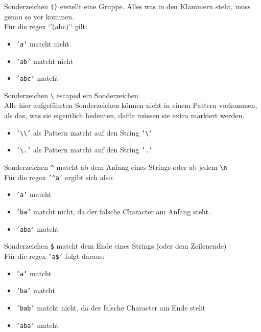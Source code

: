 \begin{frame}{Sonderzeichen}
	\texttt{()} erstellt eine Gruppe. Alles was in den Klammern steht, muss genau so vor kommen.\\[.25cm]
	Für die regex `'(abc)'` gilt:\\
	\begin{itemize}
		\item \texttt{'a'} matcht nicht
		\item \texttt{'ab'} matcht nicht
		\item \texttt{'abc'} matcht
	\end{itemize}
\end{frame}

\begin{frame}{Sonderzeichen}
	\texttt{\textbackslash} escaped ein Sonderzeichen.\\[.25cm]
	Alle hier aufgeführten Sonderzeichen können nicht in einem Pattern vorkommen, als das, was sie eigentlich bedeuten, dafür müssen sie extra markiert werden.\\
	\begin{itemize}
		\item \texttt{'\textbackslash\textbackslash'} als Pattern matcht auf den String \texttt{'\textbackslash'}
		\item \texttt{'\textbackslash.'} als Pattern matcht auf den String \texttt{'.'}
	\end{itemize}
\end{frame}

\begin{frame}{Sonderzeichen}
	\texttt{\^} matcht ab dem Anfang eines Strings oder ab jedem \texttt{\textbackslash{}n}\\[.25cm]
	Für die regex \texttt{'\^{}a'} ergibt sich also:\\
	\begin{itemize}
		\item \texttt{'a'} matcht
		\item \texttt{'ba'} matcht nicht, da der falsche Character am Anfang steht.
		\item \texttt{'aba'} matcht
	\end{itemize}	
\end{frame}

\begin{frame}{Sonderzeichen}
	\texttt{\$} matcht dem Ende eines Strings (oder dem Zeilenende)\\[.25cm]
	Für die regex \texttt{'a\$'} folgt daraus:\\
	\begin{itemize}
		\item \texttt{'a'} matcht
		\item \texttt{'ba'} matcht
		\item \texttt{'bab'} matcht nicht, da der falsche Character am Ende steht
		\item \texttt{'aba'} matcht
	\end{itemize}
\end{frame}

